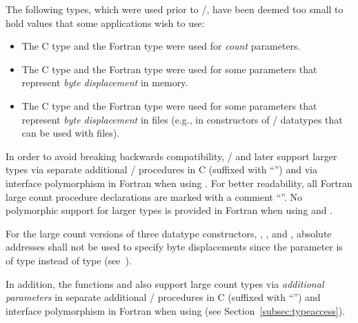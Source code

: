 The following types, which were used prior to \MPIIVDOTO/, have been deemed too small
to hold values that some applications wish to use:
\begin{itemize}
\item The C  type and the Fortran  type were
  used for \emph{count} parameters.
\item The C  type
  and the Fortran  type
  were used for some parameters that represent \emph{byte displacement} in memory.
\item The C  type
  and the Fortran  type
  were used for some parameters that represent \emph{byte displacement} in files 
  (e.g., in constructors of \MPI/ datatypes that can be used with files).
\end{itemize}
%
In order to avoid breaking backwards compatibility,
\MPIIVDOTO/ and later support larger types via
separate additional \MPI/ procedures in C (suffixed with ``'') %
and via
interface polymorphism in Fortran when using .
For better readability, all Fortran large count procedure declarations
are marked with a comment ``''. %
No polymorphic support for larger types is provided in Fortran when using  and .

For the large count versions of three datatype constructors, ,  , and  , absolute addresses shall not be used to specify byte displacements since the parameter is of type  instead of type  (see~). 

In addition, the functions
 and
 also support large count types
via \emph{additional parameters} in
separate additional \MPI/ procedures in C (suffixed with ``'')
and
interface polymorphism in Fortran when using 
(see Section~\ref{subsec:typeaccess}).

